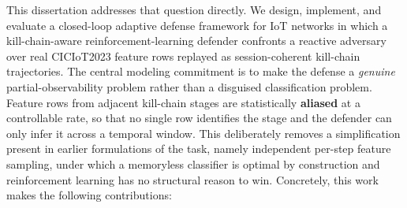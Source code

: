 This dissertation addresses that question directly. We design, implement, and evaluate a closed-loop adaptive defense framework for IoT networks in which a kill-chain-aware reinforcement-learning defender confronts a reactive adversary over real CICIoT2023 feature rows replayed as session-coherent kill-chain trajectories. The central modeling commitment is to make the defense a \emph{genuine} partial-observability problem rather than a disguised classification problem. Feature rows from adjacent kill-chain stages are statistically \textbf{aliased} at a controllable rate, so that no single row identifies the stage and the defender can only infer it across a temporal window. This deliberately removes a simplification present in earlier formulations of the task, namely independent per-step feature sampling, under which a memoryless classifier is optimal by construction and reinforcement learning has no structural reason to win. Concretely, this work makes the following contributions:

